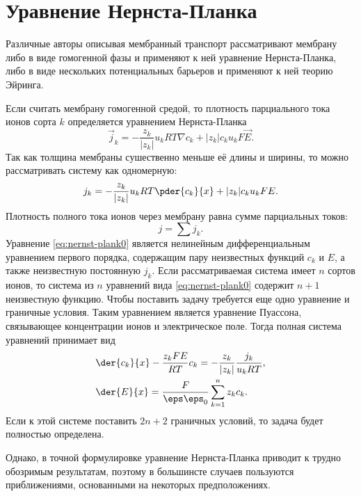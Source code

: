 \documentclass{hedwork}
\begin{document}
\tableofcontents
\section{Уравнение Нернста-Планка}
    Различные авторы описывая мембранный транспорт рассматривают мембрану либо в
    виде гомогенной фазы и применяют к ней уравнение Нернста-Планка, либо в виде
    нескольких потенциальных барьеров и применяют к ней теорию Эйринга.

    Если считать мембрану гомогенной средой, то плотность парциального тока
    ионов сорта \(k\) определяется уравнением Нернста-Планка
    \[
        \vec{j}_k = -\frac{z_k}{|z_k|}u_kRT\nabla c_k + |z_k|c_ku_kF\vec{E}.
    \]
    Так как толщина мембраны сушественно меньше её длины и ширины, то можно
    рассматривать систему как одномерную:
    \begin{equation}
        j_k = -\frac{z_k}{|z_k|}u_kRT\pder{c_k}{x} + |z_k|c_ku_kFE.
        \label{eq:nernst-plank0}
    \end{equation}
    Плотность полного тока ионов через мембрану равна сумме парциальных токов:
    \[
        j = \sum j_k.
    \]
    Уравнение \eqref{eq:nernst-plank0} является нелинейным дифференциальным
    уравнением первого порядка, содержащим пару неизвестных функций \( c_k \) и
    \( E \), а также неизвестную постоянную \( j_k \). Если рассматриваемая
    система имеет \( n \) сортов ионов, то система из \( n \) уравнений вида
    \eqref{eq:nernst-plank0} содержит \( n + 1 \) неизвестную функцию. Чтобы
    поставить задачу требуется еще одно уравнение и граничные условия. Таким
    уравнением является уравнение Пуассона, связывающее концентрации ионов и
    электрическое поле. Тогда полная система уравнений принимает вид
    \begin{align*}
        & \der{c_k}{x} - \frac{z_kFE}{RT}c_k =
            -\frac{z_k}{|z_k|}\frac{j_k}{u_kRT}, \\
        & \der{E}{x} = \frac{F}{\eps\eps_0}\sum_{k=1}^n z_k c_k.
    \end{align*}
    Если к этой системе поставить \( 2n+2 \) граничных условий, то задача будет
    полностью определена.
    
    Однако, в точной формулировке уравнение Нернста-Планка приводит к трудно
    обозримым результатам, поэтому в большинсте случаев пользуются
    приближениями, основанными на некоторых предположениях.
    
\end{document}
